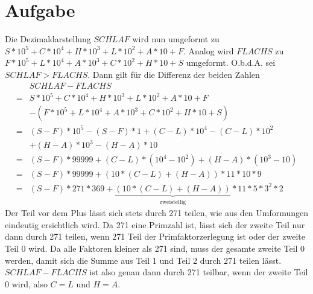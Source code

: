 \documentclass{article}
\numberwithin{equation}{section}
\begin{document}
	\section{Aufgabe}
	Die Dezimaldarstellung $SCHLAF$ wird nun umgeformt zu $S*10^5+C*10^4+H*10^3+L*10^2+A*10+F$. Analog wird $FLACHS$ zu $F*10^5+L*10^4+A*10^3+C*10^2+H*10+S$ umgeformt.
	O.b.d.A. sei $SCHLAF>FLACHS$. Dann gilt für die Differenz der beiden Zahlen 
	\begin{align*}
		&SCHLAF-FLACHS\\
		=&S*10^5+C*10^4+H*10^3+L*10^2+A*10+F\\&-(F*10^5+L*10^4+A*10^3+C*10^2+H*10+S)\\
		=&(S-F)*10^5-(S-F)*1+(C-L)*10^4-(C-L)*10^2\\&+(H-A)*10^3-(H-A)*10\\
		=&(S-F)*99999+(C-L)*(10^4-10^2)+(H-A)*(10^3-10)\\
		=&(S-F)*99999+(10*(C-L)+(H-A))*11*10*9\\
		=&(S-F)*271*369+\underbrace{(10*(C-L)+(H-A))}_{\text{zweistellig}}*11*5*3^2*2
	\end{align*}
	Der Teil vor dem Plus lässt sich stets durch 271 teilen, wie aus den Umformungen eindeutig ersichtlich wird.
	Da 271 eine Primzahl ist, lässt sich der zweite Teil nur dann durch 271 teilen, wenn 271 Teil der Primfaktorzerlegung ist oder der zweite Teil 0 wird. Da alle Faktoren kleiner als 271 sind, muss der gesamte zweite Teil 0 werden, damit sich die Summe aus Teil 1 und Teil 2 durch 271 teilen lässt.
	$SCHLAF-FLACHS$ ist also genau dann durch 271 teilbar, wenn der zweite Teil 0 wird, also $C=L$ und $H=A$.
	\newpage
\end{document}
